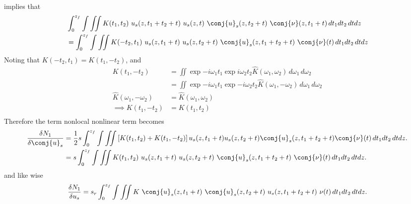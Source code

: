 implies that
\begin{equation}
 \begin{split}
&\int_{0}^{z_f} \int \iint  K(t_1,t_2) \ u_s(z,t_1+t_2+t) \ u_s(z,t) \ \conj{u}_s(z,t_2+t) \ \conj{\nu}(z,t_1+t)\,dt_1 dt_2 \, dt dz \\
&=  \int_{0}^{z_f} \int \iint K(-t_2,t_1) \ u_s(z,t_1+t) \ u_s(z,t_2+t) \ \conj{u}_s(z,t_1+t_2+t) \ \conj{\nu}(t)  \,dt_1 dt_2  \, dt dz\\
\end{split}
\end{equation}
Noting that $K(-t_2,t_1) = K(t_1,-t_2)$, and 
\begin{equation}\label{equ:DMCGLE_Kernal}
\begin{split}
K(t_1,-t_2) &= \iint \exp{-i \omega_1 t_1} \exp{i \omega_2 t_2 }   \hat{K}(\omega_1,\omega_2) \,d\omega_1 \,d\omega_2 \\
&= \iint \exp{-i \omega_1 t_1} \exp{-i \omega_2 t_2 }   \hat{K}(\omega_1,-\omega_2) \,d\omega_1 \,d\omega_2 \\
\hat{K}(\omega_1,-\omega_2) &= \hat{K}(\omega_1,\omega_2)\\
\implies K(t_1,-t_2)&= K(t_1,t_2)\\
\end{split}
\end{equation}
Therefore the term nonlocal nonlinear term becomes
\begin{equation}\label{equ:Nonlinear_Term_Functional}
 \begin{split}
\frac{\delta N_1}{\delta \conj{u}_s} & = \frac{1}{2}s \int_{0}^{z_f} \int \iint  \left[K(t_1,t_2) + K(t_1,-t_2)\right] u_s(z,t_1+t) u_s(z,t_2+t) \conj{u}_s(z,t_1+t_2+t) \conj{\nu}(t)  \,dt_1 dt_2 \, dt dz. \\
& = s \int_{0}^{z_f} \int \iint K(t_1,t_2)\ u_s(z,t_1+t)\ u_s(z,t_2+t)\ \conj{u}_s(z,t_1+t_2+t)  \ \conj{\nu}(t)  \,dt_1 dt_2 \, dt dz. \\
\end{split}
\end{equation}
and like wise
\begin{equation}
 \begin{split}
\frac{\delta N_1}{\delta u_s} & = s_r \int_{0}^{z_f} \int \iint K\ \conj{u}_s(z,t_1+t)\ \conj{u}_s(z,t_2+t)\ u_s(z,t_1+t_2+t)  \ \nu(t)  \,dt_1 dt_2 \, dt dz. \\
\end{split}
\end{equation}

